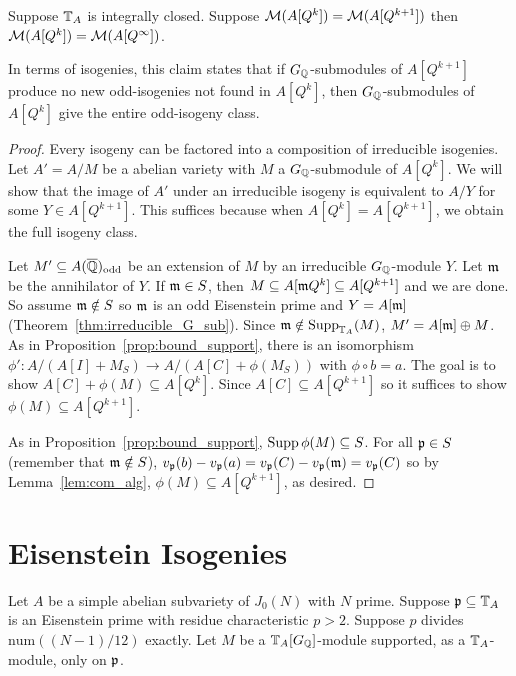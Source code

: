 \documentclass[thesis.tex]{subfiles}
\begin{document}
\begin{proposition}%
    \label{prop:stop_looking}
    Suppose $\mathbb{T}_A$ is integrally closed. Suppose $\mathcal{M}(A[Q^k])=\mathcal{M}(A[Q^{k+1}])$
    then $\mathcal{M}(A[Q^k])=\mathcal{M}(A[Q^\infty])$.

    In terms of isogenies, this claim states that if $G_{\mathbb{Q}}$-submodules of
    $A[Q^{k+1}]$ produce no new odd-isogenies not found in $A[Q^k]$, then
    $G_{\mathbb{Q}}$-submodules of $A[Q^k]$ give the entire odd-isogeny class.
\end{proposition}
\begin{proof}
    Every isogeny can be factored into a composition of irreducible isogenies.
    Let $A'=A/M$ be a abelian variety with $M$ a $G_{\mathbb{Q}}$-submodule of $A[Q^k]$. We
    will show that the image of $A'$ under an irreducible isogeny is equivalent
    to $A/Y$ for some $Y\in A[Q^{k+1}]$. This suffices because when
    $A[Q^k]=A[Q^{k+1}]$, we obtain the full isogeny class.

    Let $M'\subseteq A(\overline{\mathbb{Q}})_{\mathrm{odd}}$ be an extension of $M$ by an irreducible
    $G_{\mathbb{Q}}$-module $Y$. Let $\mathfrak{m}$ be the annihilator of $Y$. If $\mathfrak{m}\in S$, then
    $M\subseteq A[\mathfrak{m} Q^k]\subseteq A[Q^{k+1}]$ and we are done. So assume
    $\mathfrak{m}\notin S$ so $\mathfrak{m}$ is an odd Eisenstein prime and $Y=A[\mathfrak{m}]$
    (Theorem~\ref{thm:irreducible_G_sub}). Since $\mathfrak{m}\notin \operatorname{Supp}_{\mathbb{T}_A}(M)$,
    $M' = A[\mathfrak{m}]\oplus M$. As in Proposition~\ref{prop:bound_support}, there is
    an isomorphism $\phi':A/(A[I]+M_S)\to A/(A[C]+\phi(M_S))$ with $\phi\circ b
    = a$. The goal is to show $A[C]+\phi(M)\subseteq A[Q^k]$. Since
    $A[C]\subseteq A[Q^{k+1}]$ so it suffices to show $\phi(M)\subseteq
    A[Q^{k+1}]$.

    As in Proposition~\ref{prop:bound_support}, $\operatorname{Supp}\phi(M)\subseteq S$. For all
    $\mathfrak{p}\in S$ (remember that $\mathfrak{m} \notin S$), $v_{\mathfrak{p}}(b)-v_{\mathfrak{p}}(a) =
    v_{\mathfrak{p}}(C)-v_{\mathfrak{p}}(\mathfrak{m})=v_{\mathfrak{p}}(C)$ so by Lemma~\ref{lem:com_alg},
    $\phi(M)\subseteq A[Q^{k+1}]$, as desired.
\end{proof}

\section{Eisenstein Isogenies}%
\label{sec:eisenstein_isogenies}


\begin{proposition}
    Let $A$ be a simple abelian subvariety of $J_0(N)$ with $N$ prime. Suppose
    $\mathfrak{p}\subseteq \mathbb{T}_A$ is an Eisenstein prime with residue characteristic
    $p>2$. Suppose $p$ divides $\mathrm{num}((N-1)/12)$ exactly. Let $M$ be a
    $\mathbb{T}_A[G_{\mathbb{Q}}]$-module supported, as a $\mathbb{T}_A$-module, only on $\mathfrak{p}$.
\end{proposition}
\end{document}
